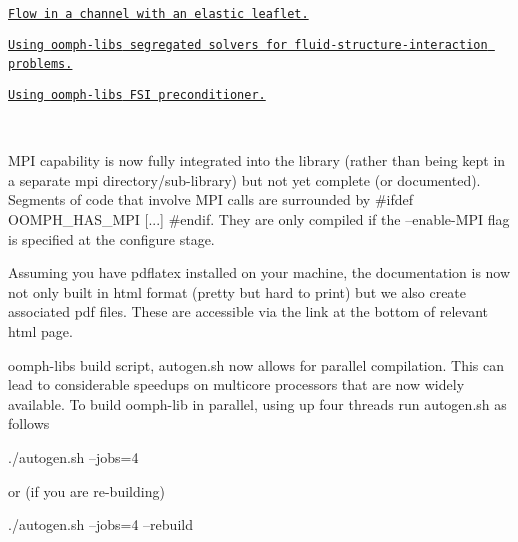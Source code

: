 \begin{DoxyItemize}
\begin{DoxyItemize}
\item \href{../../interaction/fsi_channel_with_leaflet/html/index.html}{\tt Flow in a channel with an elastic leaflet.} ~\newline
~\newline

\item \href{../../interaction/fsi_channel_segregated_solver/html/index.html}{\tt Using {\ttfamily oomph-\/lib\textquotesingle{}s} segregated solvers for fluid-\/structure-\/interaction problems.} ~\newline
~\newline

\item \href{../../preconditioners/fsi/html/index.html}{\tt Using {\ttfamily oomph-\/lib\textquotesingle{}s} F\+SI preconditioner.}
\end{DoxyItemize}~\newline
~\newline

\item M\+PI capability is now fully integrated into the library (rather than being kept in a separate mpi directory/sub-\/library) but not yet complete (or documented). Segments of code that involve M\+PI calls are surrounded by {\ttfamily \#ifdef} {\ttfamily O\+O\+M\+P\+H\+\_\+\+H\+A\+S\+\_\+\+M\+PI} {\ttfamily }\mbox{[}...\mbox{]} {\ttfamily \#endif}. They are only compiled if the {\ttfamily --enable-\/\+M\+PI} flag is specified at the configure stage. ~\newline
~\newline

\item Assuming you have {\ttfamily pdflatex} installed on your machine, the documentation is now not only built in html format (pretty but hard to print) but we also create associated pdf files. These are accessible via the link at the bottom of relevant html page. ~\newline
~\newline

\item {\ttfamily oomph-\/lib\textquotesingle{}s} build script, {\ttfamily autogen}.{\ttfamily sh} now allows for parallel compilation. This can lead to considerable speedups on multicore processors that are now widely available. To build {\ttfamily oomph-\/lib} in parallel, using up four threads run {\ttfamily autogen}.{\ttfamily sh} as follows 
\begin{DoxyCode}
./autogen.sh --jobs=4 
\end{DoxyCode}
 or (if you are re-\/building) 
\begin{DoxyCode}
./autogen.sh --jobs=4 --rebuild
\end{DoxyCode}
 ~\newline
~\newline


\end{DoxyItemize}
